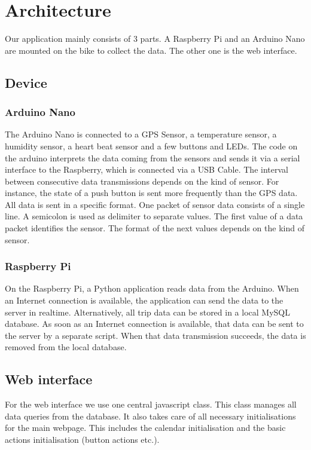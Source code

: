 \section{Architecture}
Our application mainly consists of 3 parts. 
A Raspberry Pi and an Arduino Nano are mounted on the bike to collect the data. 
The other one is the web interface.
\subsection{Device}
\subsubsection{Arduino Nano}
The Arduino Nano is connected to a GPS Sensor, a temperature sensor, a humidity sensor, a heart beat sensor and a few buttons and LEDs. 
The code on the arduino interprets the data coming from the sensors and sends it via a serial interface to the Raspberry, which is connected via a USB Cable.
The interval between consecutive data transmissions depends on the kind of sensor. 
For instance, the state of a push button is sent more frequently than the GPS data.
All data is sent in a specific format. One packet of sensor data consists of a single line.
A semicolon is used as delimiter to separate values. The first value of a data packet identifies the sensor. 
The format of the next values depends on the kind of sensor.
\subsubsection{Raspberry Pi}
On the Raspberry Pi, a Python application reads data from the Arduino. 
When an Internet connection is available, the application can send the data to the server in realtime.
Alternatively, all trip data can be stored in a local MySQL database. 
As soon as an Internet connection is available, that data can be sent to the server by a separate script.
When that data transmission succeeds, the data is removed from the local database.
\subsection{Web interface}
For the web interface we use one central javascript class. This class manages all data queries from the database.
It also takes care of all necessary initialisations for the main webpage. This includes the calendar initialisation and
the basic actions initialisation (button actions etc.).

